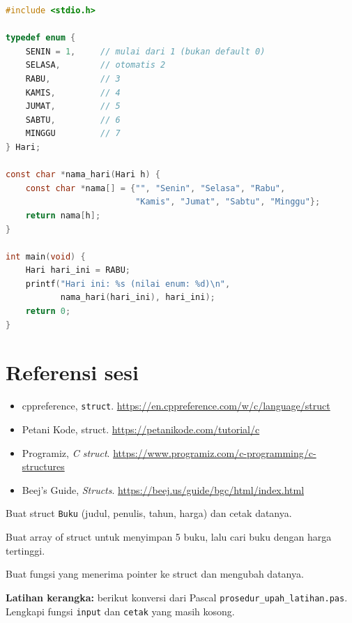 \documentclass[../main.tex]{subfiles}
\begin{document}
\begin{lstlisting}[language=C,caption=Penggunaan \texttt{enum}]
#include <stdio.h>

typedef enum {
    SENIN = 1,     // mulai dari 1 (bukan default 0)
    SELASA,        // otomatis 2
    RABU,          // 3
    KAMIS,         // 4
    JUMAT,         // 5
    SABTU,         // 6
    MINGGU         // 7
} Hari;

const char *nama_hari(Hari h) {
    const char *nama[] = {"", "Senin", "Selasa", "Rabu",
                          "Kamis", "Jumat", "Sabtu", "Minggu"};
    return nama[h];
}

int main(void) {
    Hari hari_ini = RABU;
    printf("Hari ini: %s (nilai enum: %d)\n",
           nama_hari(hari_ini), hari_ini);
    return 0;
}
\end{lstlisting}

\section{Referensi sesi}
\begin{itemize}[leftmargin=*]
  \item cppreference, \texttt{struct}. \url{https://en.cppreference.com/w/c/language/struct}
  \item Petani Kode, struct. \url{https://petanikode.com/tutorial/c}
  \item Programiz, \textit{C struct}. \url{https://www.programiz.com/c-programming/c-structures}
  \item Beej's Guide, \textit{Structs}. \url{https://beej.us/guide/bgc/html/index.html}
\end{itemize}

\begin{aktivitas}
  \item Buat struct \texttt{Buku} (judul, penulis, tahun, harga) dan cetak datanya.
  \item Buat array of struct untuk menyimpan 5 buku, lalu cari buku dengan harga tertinggi.
  \item Buat fungsi yang menerima pointer ke struct dan mengubah datanya.
  \item \textbf{Latihan kerangka:} berikut konversi dari Pascal \texttt{prosedur\_upah\_latihan.pas}. Lengkapi fungsi \texttt{input} dan \texttt{cetak} yang masih kosong.
\end{aktivitas}
\end{document}
